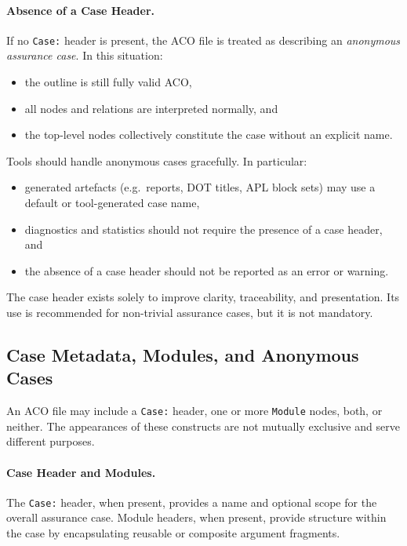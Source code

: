 \documentclass[11pt]{article}
\begin{document}
\paragraph{Absence of a Case Header.}
If no \texttt{Case:} header is present, the ACO file is treated as describing an
\emph{anonymous assurance case}. In this situation:
\begin{itemize}[leftmargin=2em]
  \item the outline is still fully valid ACO,
  \item all nodes and relations are interpreted normally, and
  \item the top-level nodes collectively constitute the case without an explicit name.
\end{itemize}

Tools should handle anonymous cases gracefully. In particular:
\begin{itemize}[leftmargin=2em]
  \item generated artefacts (e.g.\ reports, DOT titles, APL block sets) may use
        a default or tool-generated case name,
  \item diagnostics and statistics should not require the presence of a case header, and
  \item the absence of a case header should not be reported as an error or warning.
\end{itemize}

The case header exists solely to improve clarity, traceability, and presentation.
Its use is recommended for non-trivial assurance cases, but it is not mandatory.

\subsection{Case Metadata, Modules, and Anonymous Cases}

An ACO file may include a \texttt{Case:} header, one or more \texttt{Module} nodes, both, or neither.
The appearances of these constructs are not mutually exclusive and serve different purposes.

\paragraph{Case Header and Modules.}
The \texttt{Case:} header, when present, provides a name and optional scope for the overall
assurance case. Module headers, when present, provide structure within the case by encapsulating
reusable or composite argument fragments.
\end{document}
